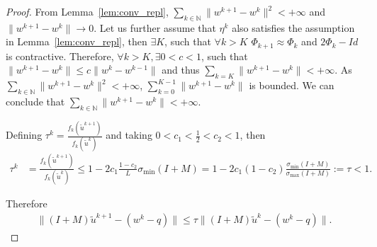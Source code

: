 \documentclass[10pt]{article} %
\begin{document}
\begin{proof}
From Lemma~\ref{lem:conv_repl}, $\sum_{k\in \mathbb{N}} \|w^{k+1} - w^k\|^2 < +\infty$ and $\|w^{k+1} -w^k\| \to 0$. 
Let us further assume that $\eta^k$ also satisfies the assumption in Lemma~\ref{lem:conv_repl}, then $\exists K$, such that $\forall k>K$ $\Phi_{k+1} \approx \Phi_k$ and $2\Phi_k-Id$ is contractive.
Therefore, $\forall k > K, \exists 0<c<1$, such that $\|w^{k+1}-w^k\| \leq c\|w^k - w^{k-1}\|$ and thus $\sum_{k=K} \|w^{k+1}-w^{k}\| < +\infty$.
As $\sum_{k\in\mathbb{N}} \|w^{k+1}-w^k\|^2 < +\infty$, $\sum_{k=0}^{K-1}\|w^{k+1}-w^k\|$ is bounded.
We can conclude that $\sum_{k\in\mathbb{N}}\|w^{k+1}-w^k\| < +\infty$.

Defining $\tau^k = \frac{f_k(\tilde{u}^{k+1})}{f_k(\tilde{u}^k)}$ and taking $0<c_1 < \frac{1}{2}<c_2<1$, then
\begin{align*}
    \tau^k &= \frac{f_k(\tilde{u}^{k+1})}{f_k(\tilde{u}^k)} \leq 1 - 2c_1 \frac{1-c_2}{L} \sigma_{\min} (I+M) = 1 - 2c_1(1-c_2) \frac{\sigma_{\min} (I+M)}{\sigma_{\max} (I+M)}  := \tau < 1.
\end{align*}


Therefore 
\begin{align*}
    \|(I+M)\tilde{u}^{k+1} - (w^k-q)\| \leq \tau \|(I+M)\tilde{u}^k - (w^k-q)\|.
\end{align*}



\end{proof}
\end{document}
